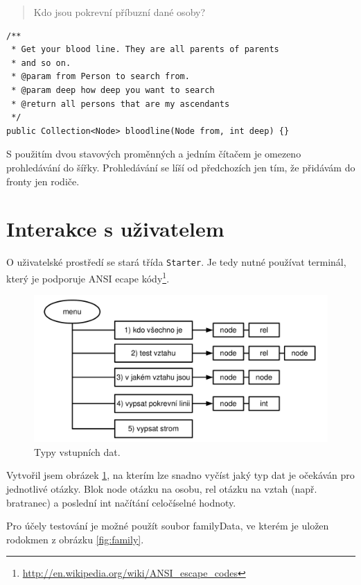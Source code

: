 \documentclass[a4paper, 12pt]{article}
\begin{document}
\begin{quote}
Kdo jsou pokrevní příbuzní dané osoby?
\end{quote}

\begin{verbatim}
/**
 * Get your blood line. They are all parents of parents
 * and so on.
 * @param from Person to search from.
 * @param deep how deep you want to search
 * @return all persons that are my ascendants
 */
public Collection<Node> bloodline(Node from, int deep) {}
\end{verbatim}

S použitím dvou stavových proměnných a jedním čítačem
je omezeno prohledávání do šířky. Prohledávání se líší od
předchozích jen tím, že přidávám do fronty jen rodiče.

\section{Interakce s uživatelem}\label{sec:int}
O uživatelské prostředí se stará třída \texttt{Starter}.
Je tedy nutné používat terminál,
který je podporuje ANSI ecape kódy\footnote{\url{http://en.wikipedia.org/wiki/ANSI_escape_codes}}.

\begin{figure}
\centering
\includegraphics[width=\textwidth]{menu}
\caption{Typy vstupních dat.}
\label{fig:input}
\end{figure}

Vytvořil jsem obrázek \ref{fig:input}, na kterím lze snadno vyčíst
jaký typ dat je očekáván pro jednotlivé otázky. Blok \textsf{node}
otázku na osobu, \textsf{rel} otázku na vztah (např. bratranec)
a poslední \textsf{int} načítání celočíselné hodnoty.

Pro účely testování je možné použít soubor \textsf{familyData},
ve kterém je uložen rodokmen z obrázku \ref{fig:family}.
\end{document}
